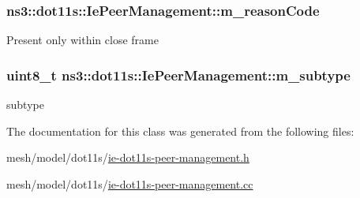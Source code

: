 \subsubsection[{\texorpdfstring{m\+\_\+reason\+Code}{m_reasonCode}}]{ ns3\+::dot11s\+::\+Ie\+Peer\+Management\+::m\+\_\+reason\+Code\hspace{0.3cm}{\ttfamily [private]}}\hypertarget{classns3_1_1dot11s_1_1IePeerManagement_a4c317afac49a324076aa14e0dd65ac31}{}\label{classns3_1_1dot11s_1_1IePeerManagement_a4c317afac49a324076aa14e0dd65ac31}
Present only within close frame 
\subsubsection[{\texorpdfstring{m\+\_\+subtype}{m_subtype}}]{\setlength{\rightskip}{0pt plus 5cm}uint8\+\_\+t ns3\+::dot11s\+::\+Ie\+Peer\+Management\+::m\+\_\+subtype\hspace{0.3cm}{\ttfamily [private]}}\hypertarget{classns3_1_1dot11s_1_1IePeerManagement_a6be443bb9cc6571e76ea6c44084ffdda}{}\label{classns3_1_1dot11s_1_1IePeerManagement_a6be443bb9cc6571e76ea6c44084ffdda}


subtype 



The documentation for this class was generated from the following files\+:\begin{DoxyCompactItemize}
\item 
mesh/model/dot11s/\hyperlink{ie-dot11s-peer-management_8h}{ie-\/dot11s-\/peer-\/management.\+h}\item 
mesh/model/dot11s/\hyperlink{ie-dot11s-peer-management_8cc}{ie-\/dot11s-\/peer-\/management.\+cc}\end{DoxyCompactItemize}
